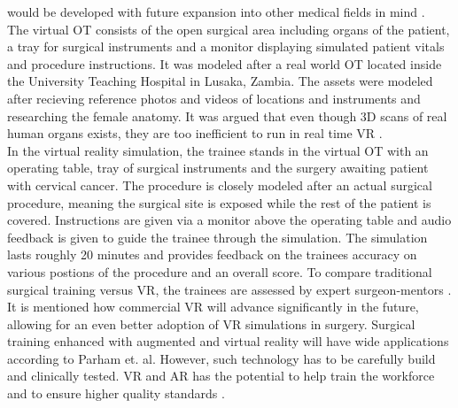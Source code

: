 would be developed with future expansion into other medical fields in mind \cite{Parham.2019}.
\\ The virtual OT consists of the open surgical area including organs of the patient, a tray
for surgical instruments and a monitor displaying simulated patient vitals and procedure
instructions. It was modeled after a real world OT located inside the University Teaching
Hospital in Lusaka, Zambia. The assets were modeled after recieving reference photos
and videos of locations and instruments and researching the female anatomy. It was
argued that even though 3D scans of real human organs exists, they are too inefficient
to run in real time VR \cite{Parham.2019}.
\\ In the virtual reality simulation, the trainee stands in the virtual OT with an operating
table, tray of surgical instruments and the surgery awaiting patient with cervical cancer.
The procedure is closely modeled after an actual surgical procedure, meaning the surgical
site is exposed while the rest of the patient is covered. Instructions are given via a
monitor above the operating table and audio feedback is given to guide the trainee
through the simulation. The simulation lasts roughly 20 minutes and provides feedback
on the trainees accuracy on various postions of the procedure and an overall score. To
compare traditional surgical training versus VR, the trainees are assessed by expert
surgeon-mentors \cite{Parham.2019}.
\\ It is mentioned how commercial VR will advance significantly in the future, allowing
for an even better adoption of VR simulations in surgery. Surgical training enhanced
with augmented and virtual reality will have wide applications according to Parham et.
al. However, such technology has to be carefully build and clinically tested. VR and
AR has the potential to help train the workforce and to ensure higher quality standards
\cite{Parham.2019}.

